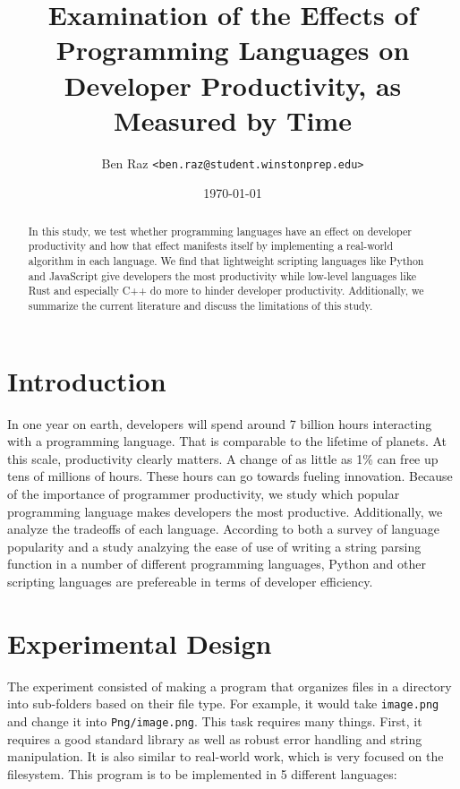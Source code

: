 \documentclass{article}
\title{
    Examination of the Effects of Programming Languages on Developer Productivity, as Measured by Time
}
\author{Ben Raz \texttt{<ben.raz@student.winstonprep.edu>}}
\date{\today}
\begin{document}
\maketitle

\begin{abstract}
    In this study, we test whether programming languages have an effect on developer productivity and how that effect manifests itself by implementing a real-world algorithm in each language. We find that lightweight scripting languages like Python and JavaScript give developers the most productivity while low-level languages like Rust and especially C++ do more to hinder developer productivity. Additionally, we summarize the current literature and discuss the limitations of this study.
\end{abstract}

\section{Introduction}

In one year on earth, developers will spend around 7 billion hours\cite{softwareCodeTime} interacting with a programming language. That is comparable to the lifetime of planets. At this scale, productivity clearly matters. A change of as little as 1\% can free up tens of millions of hours. These hours can go towards fueling innovation. Because of the importance of programmer productivity, we study which popular programming language makes developers the most productive. Additionally, we analyze the tradeoffs of each language. According to both a survey of language popularity\cite{tiobe} and a study analzying the ease of use of writing a string parsing function in a number of different programming languages\cite{prechelt2000}, Python and other scripting languages are prefereable in terms of developer efficiency.

\section{Experimental Design}

The experiment consisted of making a program that organizes files in a directory into sub-folders based on their file type. For example, it would take \texttt{image.png} and change it into \texttt{Png/image.png}. This task requires many things. First, it requires a good standard library as well as robust error handling and string manipulation. It is also similar to real-world work, which is very focused on the filesystem. This program is to be implemented in 5 different languages:
\end{document}
